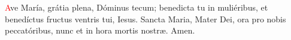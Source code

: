 \textcolor{red}{A}ve María, grátia plena, Dóminus tecum; benedicta tu in muliéribus, et benedíctus fructus ventris tui,
Iesus. Sancta Maria, Mater Dei, ora pro nobis peccatóribus, nunc et in hora mortis nostr{\ae}. Amen.